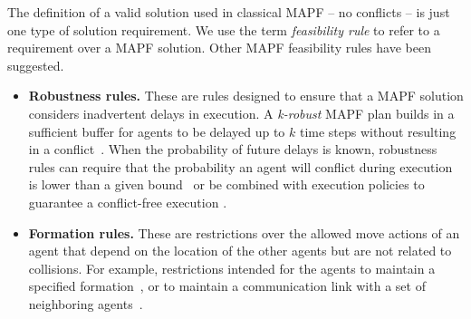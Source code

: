 \documentclass[letterpaper]{article} %
\newcommand{\mapf}{\ac{MAPF}\xspace}
\newcommand{\comment}[1]{{\nb{\textbf{Comment:}}{orange}{#1}}}
\begin{document}
The definition of a valid solution used in classical MAPF -- no conflicts -- is just one 
type of solution requirement. 
We use the term \emph{feasibility rule} to refer to a requirement over a \mapf solution. Other \mapf feasibility rules have been suggested.

\begin{itemize}
\item \textbf{Robustness rules.} These are rules designed to ensure that a \mapf solution considers inadvertent delays in execution. A \emph{k-robust} MAPF plan builds in a sufficient buffer for agents to be delayed up to $k$ time steps without resulting in a conflict~\cite{atzmon2018robust}. 
When the probability of future delays is known, robustness rules can require that the probability an agent will conflict during execution is lower than a given bound~\cite{wagner2017path} or be combined with execution policies to guarantee a conflict-free execution \cite{MaAAAI17}.

\item \textbf{Formation rules.} These are restrictions over the allowed move actions of an agent that depend on the location of the other agents but are not related to collisions. For example, restrictions intended for the agents to maintain a specified formation~\cite{barel2017come}, or to maintain a communication link with a set of neighboring agents~\cite{stump2011visibility,gilboa2006distributed}. 

\end{itemize}



\end{document}

